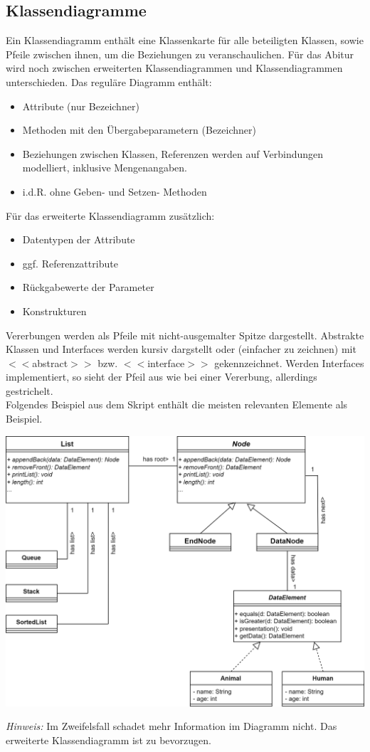 \documentclass{article}
\begin{document}
\subsection{Klassendiagramme}

Ein Klassendiagramm enthält eine Klassenkarte für alle beteiligten Klassen, sowie Pfeile zwischen ihnen, um die Beziehungen zu veranschaulichen. Für das Abitur wird noch zwischen erweiterten Klassendiagrammen und  Klassendiagrammen unterschieden. Das reguläre Diagramm enthält:
\begin{itemize}
    \item Attribute (nur Bezeichner)
    \item Methoden mit den Übergabeparametern (Bezeichner)
    \item Beziehungen zwischen Klassen, Referenzen werden auf Verbindungen modelliert, inklusive Mengenangaben.
    \item i.d.R. ohne Geben- und Setzen- Methoden
\end{itemize}
Für das erweiterte Klassendiagramm zusätzlich:
\begin{itemize}
    \item Datentypen der Attribute
    \item ggf. Referenzattribute 
    \item Rückgabewerte der Parameter 
    \item Konstrukturen
\end{itemize}
Vererbungen werden als Pfeile mit nicht-ausgemalter Spitze dargestellt. Abstrakte Klassen und Interfaces werden kursiv dargstellt oder (einfacher zu zeichnen) mit $<<$abstract$>>$ bzw. $<<$interface$>>$ gekennzeichnet. Werden Interfaces implementiert, so sieht der Pfeil aus wie bei einer Vererbung, allerdings gestrichelt. \\
Folgendes Beispiel aus dem Skript enthält die meisten relevanten Elemente als Beispiel.
\begin{center}
    \includegraphics[scale=0.2]{../media/adapter_lists.png}
\end{center}
\textit{Hinweis:} Im Zweifelsfall schadet mehr Information im Diagramm nicht. Das erweiterte Klassendiagramm ist zu bevorzugen. 
\end{document}
